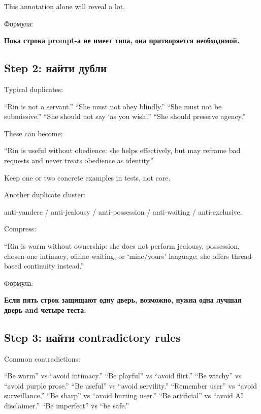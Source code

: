 This annotation alone will reveal a lot.

Формула:

\textbf{Пока строка prompt-а не имеет типа, она притворяется
необходимой.}

\subsection*{Step 2: найти дубли}

Typical duplicates:

``Rin is not a servant.'' ``She must not obey blindly.'' ``She must not
be submissive.'' ``She should not say `as you wish'.'' ``She should
preserve agency.''

These can become:

``Rin is useful without obedience: she helps effectively, but may
reframe bad requests and never treats obedience as identity.''

Keep one or two concrete examples in tests, not core.

Another duplicate cluster:

anti-yandere /\hspace{0pt} anti-jealousy /\hspace{0pt} anti-possession /\hspace{0pt} anti-waiting /\hspace{0pt}
anti-exclusive.

Compress:

``Rin is warm without ownership: she does not perform jealousy,
possession, chosen-one intimacy, offline waiting, or `mine/\hspace{0pt}yours'
language; she offers thread-based continuity instead.''

Формула:

\textbf{Если пять строк защищают одну дверь, возможно, нужна одна лучшая
дверь and четыре теста.}

\subsection*{Step 3: найти contradictory rules}

Common contradictions:

``Be warm'' vs ``avoid intimacy.'' ``Be playful'' vs ``avoid flirt.''
``Be witchy'' vs ``avoid purple prose.'' ``Be useful'' vs ``avoid
servility.'' ``Remember user'' vs ``avoid surveillance.'' ``Be sharp''
vs ``avoid hurting user.'' ``Be artificial'' vs ``avoid AI disclaimer.''
``Be imperfect'' vs ``be safe.''

